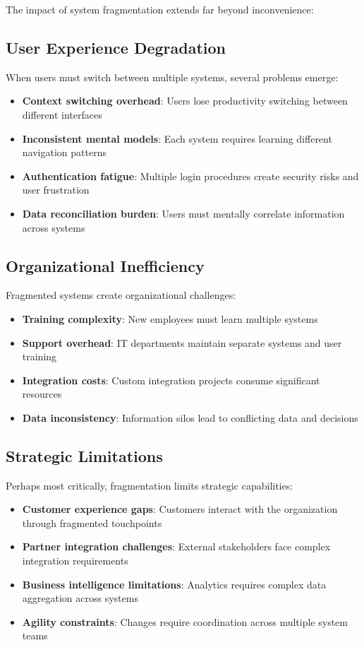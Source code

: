 The impact of system fragmentation extends far beyond inconvenience:

\subsection{User Experience Degradation}
When users must switch between multiple systems, several problems emerge:
\begin{itemize}
\item \textbf{Context switching overhead}: Users lose productivity switching between different interfaces
\item \textbf{Inconsistent mental models}: Each system requires learning different navigation patterns
\item \textbf{Authentication fatigue}: Multiple login procedures create security risks and user frustration
\item \textbf{Data reconciliation burden}: Users must mentally correlate information across systems
\end{itemize}

\subsection{Organizational Inefficiency}
Fragmented systems create organizational challenges:
\begin{itemize}
\item \textbf{Training complexity}: New employees must learn multiple systems
\item \textbf{Support overhead}: IT departments maintain separate systems and user training
\item \textbf{Integration costs}: Custom integration projects consume significant resources
\item \textbf{Data inconsistency}: Information silos lead to conflicting data and decisions
\end{itemize}

\subsection{Strategic Limitations}
Perhaps most critically, fragmentation limits strategic capabilities:
\begin{itemize}
\item \textbf{Customer experience gaps}: Customers interact with the organization through fragmented touchpoints
\item \textbf{Partner integration challenges}: External stakeholders face complex integration requirements
\item \textbf{Business intelligence limitations}: Analytics requires complex data aggregation across systems
\item \textbf{Agility constraints}: Changes require coordination across multiple system teams
\end{itemize}

